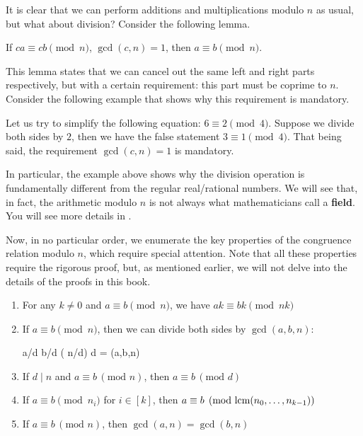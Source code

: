 \documentclass[../lecture-notes-148x210.tex]{subfiles}
\begin{document}
It is clear that we can perform additions and multiplications modulo $n$ as usual, but what 
about division? Consider the following lemma.

\begin{lemma}
    If $ca \equiv cb \pmod{n}$, $\gcd(c, n) = 1$, then $ a \equiv b \pmod{n}$.
\end{lemma}

This lemma states that we can cancel out the same left and right parts
respectively, but with a certain requirement: this part must be coprime to $n$.
Consider the following example that shows why this requirement is mandatory.

\begin{example}
    Let us try to simplify the following equation: $6 \equiv 2 \pmod{4}$. Suppose we 
    divide both sides by $2$, then we have the false statement $3 \equiv 1 \pmod{4}$. 
    That being said, the requirement $\gcd(c, n) = 1$ is mandatory. 
\end{example}

\begin{remark}
    In particular, the example above shows why the division operation is fundamentally 
    different from the regular real/rational numbers. We will see that, in fact, the 
    arithmetic modulo $n$ is not always what mathematicians call a \textbf{field}. 
    You will see more details in .
\end{remark}

Now, in no particular order, we enumerate the key properties of the congruence relation modulo $n$, 
which require special attention. Note that all these properties require the rigorous proof,
but, as mentioned earlier, we will not delve into the details of the proofs in this book.

\begin{lemma}\label{lemma:congruence_scale}
    \hfill
    \begin{enumerate}
        \item For any $k \neq 0$ and $a \equiv b \pmod{n}$, we have $ak \equiv bk \pmod{nk}$
        \item If $a \equiv b \pmod{n}$, then we can divide both sides by $\gcd(a, b, n)$:
        \begin{xequation*}
            a/d \equiv b/d \; (\; n/d) \;  \; d = \gcd(a,b,n)
        \end{xequation*}
        \item If $d \mid n$ and $a \equiv b \, (\text{mod } n)$, then $a \equiv b \, (\text{mod } d)$
        \item If $a \equiv b \pmod{n_i}$ for $i \in [k]$, then $a \equiv b \pmod{\text{lcm}(n_0,\dots,n_{k-1})}$
        \item If $a \equiv b \, (\text{mod } n)$, then $\gcd(a, n) = \gcd(b, n)$
\end{enumerate}
\end{lemma}
\end{document}
